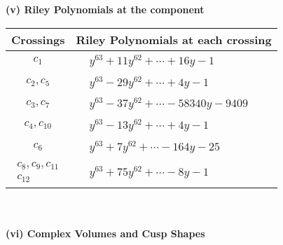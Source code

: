 \documentclass[1p]{elsarticle_modified}
\theoremstyle{definition}
\begin{document}
\newpage\renewcommand{\arraystretch}{1}
\flushleft \textbf{(v) Riley Polynomials at the component}\newline \\
\begin{tabular}{m{50pt}|m{274pt}}
Crossings & \hspace{64pt}Riley Polynomials at each crossing \\
\hline $$\begin{aligned}c_{1}\end{aligned}$$&$\begin{aligned}
&y^{63}+11 y^{62}+\cdots+16 y-1
\end{aligned}$\\
\hline $$\begin{aligned}c_{2},c_{5}\end{aligned}$$&$\begin{aligned}
&y^{63}-29 y^{62}+\cdots+4 y-1
\end{aligned}$\\
\hline $$\begin{aligned}c_{3},c_{7}\end{aligned}$$&$\begin{aligned}
&y^{63}-37 y^{62}+\cdots-58340 y-9409
\end{aligned}$\\
\hline $$\begin{aligned}c_{4},c_{10}\end{aligned}$$&$\begin{aligned}
&y^{63}-13 y^{62}+\cdots+4 y-1
\end{aligned}$\\
\hline $$\begin{aligned}c_{6}\end{aligned}$$&$\begin{aligned}
&y^{63}+7 y^{62}+\cdots-164 y-25
\end{aligned}$\\
\hline $$\begin{aligned}c_{8},c_{9},c_{11}\\c_{12}\end{aligned}$$&$\begin{aligned}
&y^{63}+75 y^{62}+\cdots-8 y-1
\end{aligned}$\\
\hline
\end{tabular}\\~\\
\newpage\flushleft \textbf{(vi) Complex Volumes and Cusp Shapes}
\end{document}
